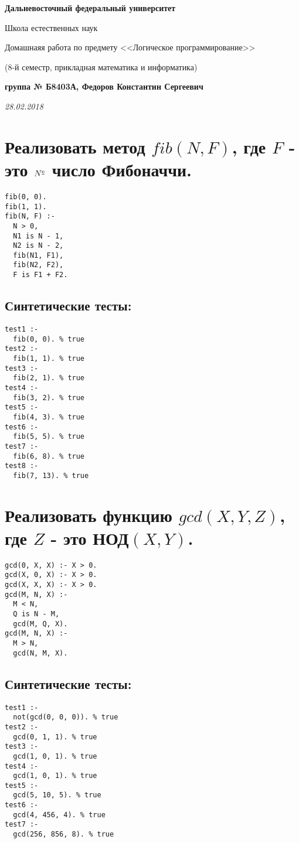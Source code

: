\documentclass[a4paper,12pt]{extreport}
\begin{document}
  \begin{center}
    \textbf{Дальневосточный федеральный университет}\par
    Школа естественных наук\par
    Домашнаяя работа по предмету <<Логическое программирование>>\par
    (8-й семестр, прикладная математика и информатика)\par
    \textbf{группа № Б8403А, Федоров Константин Сергеевич}\par
    \textit{28.02.2018}
  \end{center}

  \chapter{Реализовать метод $fib(N, F)$, где $F$ - это $N^{\text{\underline{e}}}$
  число Фибоначчи.}\par
  \begin{lstlisting}[caption=fib(N{,} F) realization, style=customProlog]
fib(0, 0).
fib(1, 1).
fib(N, F) :-
  N > 0,
  N1 is N - 1,
  N2 is N - 2,
  fib(N1, F1),
  fib(N2, F2),
  F is F1 + F2.
  \end{lstlisting}
  \section{Синтетические тесты:}\par
  \begin{lstlisting}[caption=fib(N{,} F) realization, style=customProlog]
test1 :-
  fib(0, 0). % true
test2 :-
  fib(1, 1). % true
test3 :-
  fib(2, 1). % true
test4 :-
  fib(3, 2). % true
test5 :-
  fib(4, 3). % true
test6 :-
  fib(5, 5). % true
test7 :-
  fib(6, 8). % true
test8 :-
  fib(7, 13). % true
  \end{lstlisting}
  \chapter{Реализовать функцию $gcd(X, Y, Z)$, где $Z$ - это НОД$(X, Y)$.}\par
  \begin{lstlisting}[caption=gcd(X{,} Y{,} Z) realization, style=customProlog]
gcd(0, X, X) :- X > 0.
gcd(X, 0, X) :- X > 0.
gcd(X, X, X) :- X > 0.
gcd(M, N, X) :-
  M < N,
  Q is N - M,
  gcd(M, Q, X).
gcd(M, N, X) :-
  M > N,
  gcd(N, M, X).
  \end{lstlisting}
  \section{Синтетические тесты:}\par
  \begin{lstlisting}[caption=gcd(X{,} Y{,} Z) F) tests, style=customProlog]
test1 :-
  not(gcd(0, 0, 0)). % true
test2 :-
  gcd(0, 1, 1). % true
test3 :-
  gcd(1, 0, 1). % true
test4 :-
  gcd(1, 0, 1). % true
test5 :-
  gcd(5, 10, 5). % true
test6 :-
  gcd(4, 456, 4). % true
test7 :-
  gcd(256, 856, 8). % true
  \end{lstlisting}
\end{document}
